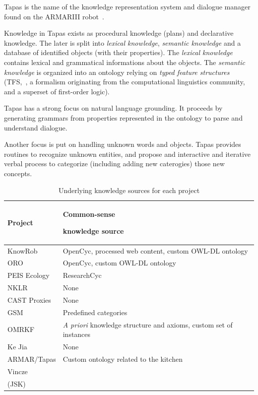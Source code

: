 \documentclass[a4paper, twocolumn]{article}
\begin{document}
{\sc Tapas} is the name of the knowledge representation system and dialogue
manager found on the ARMARIII robot~\cite{Holzapfel2008}.

Knowledge in {\sc Tapas} exists as procedural knowledge (plans) and declarative
knowledge. The later is split into \emph{lexical knowledge}, \emph{semantic
knowledge} and a database of identified objects (with their properties). The
\emph{lexical knowledge} contains lexical and grammatical informations about
the objects. The \emph{semantic knowledge} is organized into an ontology
relying on \emph{typed feature structures} (TFS,~\cite{Carpenter1992}, a
formalism originating from the computational linguistics community, and a
superset of first-order logic).

{\sc Tapas} has a strong focus on natural language grounding. It proceeds by
generating grammars from properties represented in the ontology to parse and
understand dialogue.

Another focus is put on handling unknown words and objects. {\sc Tapas}
provides routines to recognize unknown entities, and propose and interactive
and iterative verbal process to categorize (including adding new caterogies)
those new concepts.

\begin{table}
\begin{center}

\begin{tabular}{lp{4cm}}
\toprule
{\bf Project} & {\bf Common-sense \par knowledge source} \\
\midrule
{\sc KnowRob} & {\sc OpenCyc}, processed web content, custom OWL-DL ontology \\
ORO & {\sc OpenCyc}, custom OWL-DL ontology \\
PEIS Ecology & {\sc ResearchCyc} \\
NKLR &  None \\
CAST Proxies &  None \\
GSM &  Predefined categories \\
OMRKF & {\it A priori} knowledge structure and axioms, custom set of instances\\
Ke Jia & None \\
ARMAR/{\sc Tapas} & Custom ontology related to the kitchen\\
Vincze & \\
(JSK) & \\

\bottomrule

\end{tabular}
\end{center}
\caption{Underlying knowledge sources for each project}
\label{table|knowledge-sources}
\end{table}
\end{document}

